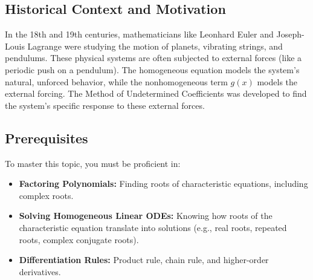\documentclass[11pt, a4paper]{article}
\theoremstyle{definition}
\theoremstyle{remark}
\begin{document}
\begin{center}
\end{center}

\subsection{Historical Context and Motivation}
In the 18th and 19th centuries, mathematicians like Leonhard Euler and Joseph-Louis Lagrange were studying the motion of planets, vibrating strings, and pendulums. These physical systems are often subjected to external forces (like a periodic push on a pendulum). The homogeneous equation models the system's natural, unforced behavior, while the nonhomogeneous term $g(x)$ models the external forcing. The Method of Undetermined Coefficients was developed to find the system's specific response to these external forces.

\subsection{Prerequisites}
To master this topic, you must be proficient in:
\begin{itemize}
    \item \textbf{Factoring Polynomials:} Finding roots of characteristic equations, including complex roots.
    \item \textbf{Solving Homogeneous Linear ODEs:} Knowing how roots of the characteristic equation translate into solutions (e.g., real roots, repeated roots, complex conjugate roots).
    \item \textbf{Differentiation Rules:} Product rule, chain rule, and higher-order derivatives.
\end{itemize}
\end{document}
